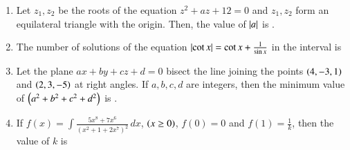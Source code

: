 \documentclass[journal,12pt,onecolumn]{IEEEtran}
\theoremstyle{remark}
\begin{document}
\begin{enumerate}
\begin{center}
   \end{center}   

\item Let $z_1, z_2$ be the roots of the equation $z^2 + az + 12 = 0$ and $z_1, z_2$ form an equilateral triangle with the origin. Then, the value of $\left\vert a\right\vert$ is \underline{\hspace{1cm}}.
\\

\item The number of solutions of the equation $\left\vert\cot x\right\vert  = \cot x + \frac{1}{\sin x}$ in the interval  is \underline{\hspace{1cm}}
\\

\item Let the plane $ax + by + cz + d = 0$ bisect the line joining the points $\left(4, -3, 1\right)$ and $\left(2, 3, -5\right)$ at right angles. If $a, b, c, d$ are integers, then the minimum value of $\left(a^2 + b^2 + c^2 + d^2\right)$ is \underline{\hspace{1cm}}.
\\
\item If $f(x) = \int \frac{5x^8 + 7x^6}{(x^2 + 1 + 2x^7)^2} \, dx$, $\left(x \geq 0\right)$, $f(0) = 0$ and $f(1) = \frac{1}{k}$, then the value of $k$ is \underline{\hspace{1cm}}




\end{enumerate}
\end{document}

